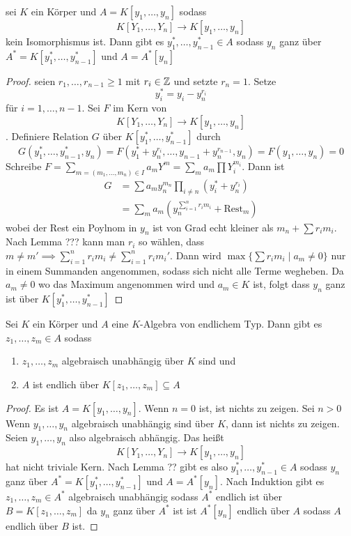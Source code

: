 \begin{Lemma}
    sei \(K\) ein Körper und \(A=K[y_1,\dots,y_n]\) sodass \[K[Y_1,\dots,Y_n]\to K[y_1,\dots,y_n]\] kein Isomorphismus ist. Dann gibt es \(y_1^*,\dots,y_{n-1}^*\in A\) sodass \(y_n\) ganz über \(A^*=K[y_1^*,\dots,y_{n-1}^*]\) und \(A=A^*[y_n]\)
\end{Lemma}
\begin{proof}
    seien \(r_1,\dots,r_{n-1}\geq 1\) mit \(r_i\in\mathbb{Z}\) und setzte \(r_n=1\). Setze \[y_i^*=y_i-y_n^{r_i}\] für \(i=1,\dots,n-1\). Sei \(F\) im Kern von 
    \[K[Y_1,\dots,Y_n]\to K[y_1,\dots,y_n]\]. Definiere Relation \(G\) über \(K[y_1^*,\dots,y_{n-1}^*]\) durch 
    \[G(y_1^*,\dots,y_{n-1}^*,y_n)=F(y_1^*+y_n^{r_i},\dots,y_{n-1}+y_n^{r_{n-1}},y_n)=F(y_1,\dots,y_n)=0\]
    Schreibe \(F=\sum_{m=(m_1,\dots,m_n)\in I} a_mY^m=\sum_ma_m\prod Y_i^{m_i}\).
    Dann ist 
    \begin{align*}
        G&=\sum a_my_n^{m_n}\prod_{i\neq n}(y_i^*+y_n^{r_i})\\
        &=\sum_ma_m(y_n^{\sum_{i=1}^n r_im_i}+\text{Rest}_m)
    \end{align*} wobei der Rest ein Poylnom in \(y_n\) ist von Grad echt kleiner als \(m_n+\sum r_im_i\).
    Nach Lemma ??? kann man \(r_i\) so wählen, dass \(m\neq m'\implies \sum_{i=1}^nr_im_i\neq \sum_{i=1}^nr_im_i'\).
    Dann wird \(\max\{\sum r_im_i\mid a_m\neq 0\}\) nur in einem Summanden angenommen, sodass sich nicht alle Terme wegheben.
    Da \(a_m\neq 0\) wo das Maximum angenommen wird und \(a_m\in K\) ist, folgt dass \(y_n\) ganz ist über \(K[y_1^*,\dots,y_{n-1}^*]\)
\end{proof}
\begin{Satz}\label{Satz:NoetherNor}
Sei \(K\) ein Körper und \(A\) eine \(K\)-Algebra von endlichem Typ. Dann gibt es \(z_1,\dots,z_m\in A\) sodass
\begin{enumerate}
    \item \(z_1,\dots,z_m\) algebraisch unabhängig über \(K\) sind und
    \item \(A\) ist endlich über \(K[z_1,\dots,z_m]\subseteq A\)
\end{enumerate}
\end{Satz}
\begin{proof}
    Es ist \(A=K[y_1,\dots,y_n]\). Wenn \(n=0\) ist, ist nichts zu zeigen.
    Sei \(n>0\) Wenn \(y_1,\dots,y_n\) algebraisch unabhängig sind über \(K\), dann ist nichts zu zeigen.
    Seien \(y_1,\dots,y_n\) also algebraisch abhängig. Das heißt \[K[Y_1,\dots,Y_n]\to K[y_1,\dots,y_n]\] hat nicht triviale Kern.
    Nach Lemma ?? gibt es also \(y_1^*,\dots,y_{n-1}^*\in A\) sodass \(y_n\) ganz über \(A^*=K[y_1^*,\dots,y_{n-1}^*]\) und \(A=A^*[y_n]\). Nach Induktion gibt es \(z_1,\dots,z_m\in A^*\) algebraisch unabhängig sodass \(A^*\) endlich ist über \(B=K[z_1,\dots,z_m]\) da \(y_n\) ganz über \(A^*\) ist ist \(A^*[y_n]\) endlich über \(A\) sodass \(A\) endlich über \(B\) ist.
\end{proof}
